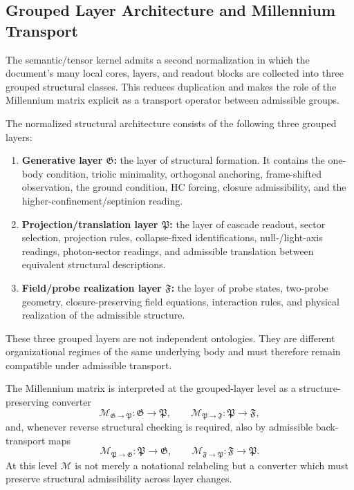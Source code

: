 \subsection*{Grouped Layer Architecture and Millennium Transport}

The semantic/tensor kernel admits a second normalization in which the document's
many local cores, layers, and readout blocks are collected into three grouped
structural classes. This reduces duplication and makes the role of the
Millennium matrix explicit as a transport operator between admissible groups.

\begin{definition}
\label{def:grouped-structural-architecture}
The normalized structural architecture consists of the following three grouped
layers:
\begin{enumerate}[leftmargin=2em,label=(G\arabic*)]
\item \textbf{Generative layer $\mathfrak G$:} the layer of structural formation. It
contains the one-body condition, triolic minimality, orthogonal anchoring,
frame-shifted observation, the ground condition, HC forcing, closure
admissibility, and the higher-confinement/septinion reading.
\item \textbf{Projection/translation layer $\mathfrak P$:} the layer of cascade readout,
sector selection, projection rules, collapse-fixed identifications, null-/light-axis
readings, photon-sector readings, and admissible translation between equivalent
structural descriptions.
\item \textbf{Field/probe realization layer $\mathfrak F$:} the layer of probe states,
two-probe geometry, closure-preserving field equations, interaction rules, and
physical realization of the admissible structure.
\end{enumerate}
These three grouped layers are not independent ontologies. They are different
organizational regimes of the same underlying body and must therefore remain
compatible under admissible transport.
\end{definition}

\begin{definition}
\label{def:millennium-transport-grouped-layers}
The Millennium matrix is interpreted at the grouped-layer level as a
structure-preserving converter
\[
\mathcal M_{\mathfrak G\to\mathfrak P}:\mathfrak G\to\mathfrak P,
\qquad
\mathcal M_{\mathfrak P\to\mathfrak F}:\mathfrak P\to\mathfrak F,
\]
and, whenever reverse structural checking is required, also by admissible
back-transport maps
\[
\mathcal M_{\mathfrak P\to\mathfrak G}:\mathfrak P\to\mathfrak G,
\qquad
\mathcal M_{\mathfrak F\to\mathfrak P}:\mathfrak F\to\mathfrak P.
\]
At this level $\mathcal M$ is not merely a notational relabeling but a
converter which must preserve structural admissibility across layer changes.
\end{definition}

